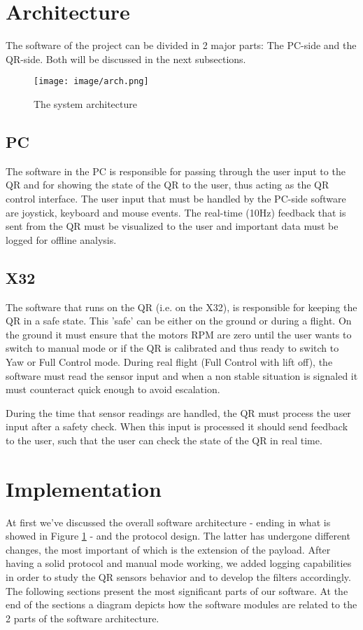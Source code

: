 \documentclass[a4paper]{article}
\begin{document}
\section{Architecture}\label{sec:arch}
The software of the project can be divided in 2 major parts: The PC-side and the QR-side. Both will be discussed in the next subsections. 
\begin{figure}[h!]
  \centering
  \texttt{[image: image/arch.png]}
  \caption{The system architecture}
  \label{fig:arch}
\end{figure}

\subsection{PC} %
The software in the PC is responsible for passing through the user input to the QR and for showing the state of the QR to the user, thus acting as the QR control interface. The user input that must be handled by the PC-side software are joystick, keyboard and mouse events. The real-time (10Hz) feedback that is sent from the QR must be visualized to the user and important data must be logged for offline analysis. 

\subsection{X32}
The software that runs on the QR (i.e. on the X32), is responsible for keeping the QR in a safe state. This 'safe' can be either on the ground or during a flight. On the ground it must ensure that the motors RPM are zero until the user wants to switch to manual mode or if the QR is calibrated and thus ready to switch to Yaw or Full Control mode. During real flight (Full Control with lift off), the software must read the sensor input and when a non stable situation is signaled it must counteract quick enough to avoid escalation.

During the time that sensor readings are handled, the QR must process the user input after a safety check. When this input is processed it should send feedback to the user, such that the user can check the state of the QR in real time.

\section{Implementation} \label{sec:impl} %
At first we've discussed the overall software  architecture - ending in what is showed in Figure \ref{fig:arch} - and the protocol design. The latter has undergone different changes, the most important of which is the extension of the payload. After having a solid protocol and manual mode working, we added logging capabilities in order to study the QR sensors behavior and to develop the filters accordingly.\\
The following sections present the most significant parts of our software. At the end of the sections a diagram depicts how the software modules are related to the 2 parts of the software architecture.
\end{document}
